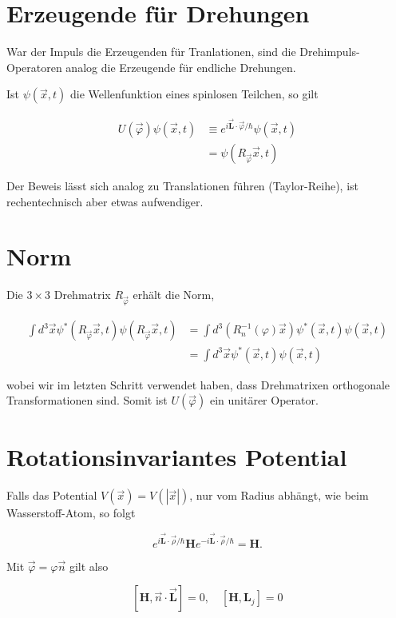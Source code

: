 \documentclass[10pt, letterpaper]{article}
\begin{document}
\section*{Erzeugende für Drehungen}
War der Impuls die Erzeugenden für Tranlationen, sind die Drehimpuls-Operatoren analog die Erzeugende für endliche Drehungen.

Ist $\psi(\vec{x}, t)$ die Wellenfunktion eines spinlosen Teilchen, so gilt

$$
\begin{aligned}
U(\vec{\varphi}) \psi(\vec{x}, t) & \equiv e^{i \overrightarrow{\mathbf{L}} \cdot \vec{\varphi} / \hbar} \psi(\vec{x}, t) \\
& =\psi\left(R_{\vec{\varphi}} \vec{x}, t\right)
\end{aligned}
$$

Der Beweis lässt sich analog zu Translationen führen (Taylor-Reihe), ist rechentechnisch aber etwas aufwendiger.

\section*{Norm}
Die $3 \times 3$ Drehmatrix $R_{\vec{\varphi}}$ erhält die Norm,

$$
\begin{aligned}
\int d^{3} \vec{x} \psi^{*}\left(R_{\vec{\varphi}} \vec{x}, t\right) \psi\left(R_{\vec{\varphi}} \vec{x}, t\right) & =\int d^{3}\left(R_{n}^{-1}(\varphi) \vec{x}\right) \psi^{*}(\vec{x}, t) \psi(\vec{x}, t) \\
& =\int d^{3} \vec{x} \psi^{*}(\vec{x}, t) \psi(\vec{x}, t)
\end{aligned}
$$

wobei wir im letzten Schritt verwendet haben, dass Drehmatrixen orthogonale Transformationen sind. Somit ist $U(\vec{\varphi})$ ein unitärer Operator.

\section*{Rotationsinvariantes Potential}
Falls das Potential $V(\vec{x})=V(|\vec{x}|)$, nur vom Radius abhängt, wie beim Wasserstoff-Atom, so folgt

$$
e^{i \overrightarrow{\mathbf{L}} \cdot \vec{\rho} / \hbar} \mathbf{H} e^{-i \overrightarrow{\mathbf{L}} \cdot \vec{\rho} / \hbar}=\mathbf{H} .
$$

Mit $\vec{\varphi}=\varphi \vec{n}$ gilt also

$$
[\mathbf{H}, \vec{n} \cdot \overrightarrow{\mathbf{L}}]=0, \quad\left[\mathbf{H}, \mathbf{L}_{j}\right]=0
$$
\end{document}
